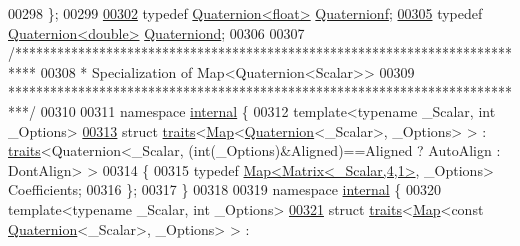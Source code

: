 \begin{DoxyCode}
00298 \};
00299 
\hyperlink{group___geometry___module_ga785b13a5a87f9bf55d4eba51ead2dcf0}{00302} \textcolor{keyword}{typedef} \hyperlink{group___geometry___module_class_eigen_1_1_quaternion}{Quaternion<float>} \hyperlink{group___geometry___module_ga785b13a5a87f9bf55d4eba51ead2dcf0}{Quaternionf};
\hyperlink{group___geometry___module_ga6e77eb8b6aae0e04be2db88107dbc642}{00305} \textcolor{keyword}{typedef} \hyperlink{group___geometry___module_class_eigen_1_1_quaternion}{Quaternion<double>} \hyperlink{group___geometry___module_ga6e77eb8b6aae0e04be2db88107dbc642}{Quaterniond};
00306 
00307 \textcolor{comment}{/***************************************************************************}
00308 \textcolor{comment}{* Specialization of Map<Quaternion<Scalar>>}
00309 \textcolor{comment}{***************************************************************************/}
00310 
00311 \textcolor{keyword}{namespace }\hyperlink{namespaceinternal}{internal} \{
00312   \textcolor{keyword}{template}<\textcolor{keyword}{typename} \_Scalar, \textcolor{keywordtype}{int} \_Options>
\hyperlink{struct_eigen_1_1internal_1_1traits_3_01_map_3_01_quaternion_3_01___scalar_01_4_00_01___options_01_4_01_4}{00313}   \textcolor{keyword}{struct }\hyperlink{struct_eigen_1_1internal_1_1traits}{traits}<\hyperlink{group___core___module_class_eigen_1_1_map}{Map}<\hyperlink{group___geometry___module_class_eigen_1_1_quaternion}{Quaternion}<\_Scalar>, \_Options> > : \hyperlink{struct_eigen_1_1internal_1_1traits}{traits}<Quaternion<\_Scalar, 
      (int(\_Options)&Aligned)==Aligned ? AutoAlign : DontAlign> >
00314   \{
00315     \textcolor{keyword}{typedef} \hyperlink{group___core___module_class_eigen_1_1_map}{Map<Matrix<\_Scalar,4,1>}, \_Options> Coefficients;
00316   \};
00317 \}
00318 
00319 \textcolor{keyword}{namespace }\hyperlink{namespaceinternal}{internal} \{
00320   \textcolor{keyword}{template}<\textcolor{keyword}{typename} \_Scalar, \textcolor{keywordtype}{int} \_Options>
\hyperlink{struct_eigen_1_1internal_1_1traits_3_01_map_3_01const_01_quaternion_3_01___scalar_01_4_00_01___options_01_4_01_4}{00321}   \textcolor{keyword}{struct }\hyperlink{struct_eigen_1_1internal_1_1traits}{traits}<\hyperlink{group___core___module_class_eigen_1_1_map}{Map}<const \hyperlink{group___geometry___module_class_eigen_1_1_quaternion}{Quaternion}<\_Scalar>, \_Options> > : 

\end{DoxyCode}
